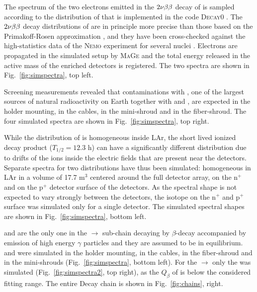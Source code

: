 \marginnote{$2\nbb$} The spectrum of the two electrons emitted in the $2\nbb$ decay of  is sampled according to the distribution of \cite{tables2nbb} that is implemented in the code \textsc{Decay0} \cite{decay0}. The $2\nbb$ decay distributions of \cite{tables2nbb} are in principle more precise than those based on the Primakoff-Rosen approximation \cite{PrimakoffRosen}, and they have been cross-checked against the high-statistics data of the \textsc{Nemo} experiment for several nuclei \cite{nemo1,nemo2,nemo3,nemo4,nemo5}. Electrons are propagated in the {\gerda} simulated setup by \textsc{MaGe} and the total energy released in the active mass of the enriched detectors is registered. The two spectra are shown in Fig.~\ref{fig:simspectra}, top left.

 Screening measurements revealed that contaminations with , one of the largest sources of natural radioactivity on Earth together with  and , are expected in the holder mounting, in the cables, in the mini-shroud and in the fiber-shroud. The four simulated spectra are shown in Fig.~\ref{fig:simspectra}, top right.

 While the distribution of  is homogeneous inside LAr, the short lived ionized decay product  ($T_{1/2} = 12.3$ h) can have a significantly different distribution due to drifts of the  ions inside the electric fields that are present near the detectors. Separate spectra for two  distributions have thus been simulated: homogeneous in LAr in a volume of 17.7 m$^3$ centered around the full detector array, on the n$^+$ and on the p$^+$ detector surface of the detectors. As the spectral shape is not expected to vary strongly between the detectors, the isotope on the n$^+$ and p$^+$ surface was simulated only for a single detector. The simulated spectral shapes are shown in Fig.~\ref{fig:simspectra}, bottom left.

  and  are the only one in the  $\rightarrow$  sub-chain decaying by $\beta$-decay accompanied by emission of high energy $\gamma$ particles and they are assumed to be in equilibrium.  and  were simulated in the holder mounting, in the cables, in the fiber-shroud and in the mini-shrouds (Fig.~\ref{fig:simspectra}, bottom left). For the  $\rightarrow$  only the  was simulated (Fig.~\ref{fig:simspectra2}, top right), as the $Q_\beta$ of  is below the considered fitting range. The entire  Decay chain is shown in Fig.~\ref{fig:chains}, right.

